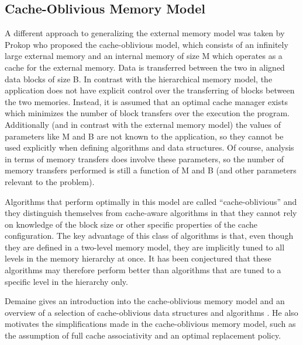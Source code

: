\documentclass{acm_proc_article-sp}
\begin{document}
\subsection{Cache-Oblivious Memory Model}
A different approach to generalizing the external memory model was taken by Prokop \cite{prokop1999coa} who proposed the cache-oblivious model, which consists of an infinitely large external memory and an internal memory of size M which operates as a cache for the external memory. Data is transferred between the two in aligned data blocks of size B. In contrast with the hierarchical memory model, the application does not have explicit control over the transferring of blocks between the two memories. Instead, it is assumed that an optimal cache manager exists which minimizes the number of block transfers over the execution the program. Additionally (and in contrast with the external memory model) the values of parameters like M and B are not known to the application, so they cannot be used explicitly when defining algorithms and data structures. Of course, analysis in terms of memory transfers does involve these parameters, so the number of memory transfers performed is still a function of M and B (and other parameters relevant to the problem).

Algorithms that perform optimally in this model are called ``cache-oblivious'' and they distinguish themselves from cache-aware algorithms in that they cannot rely on knowledge of the block size or other specific properties of the cache configuration. The key advantage of this class of algorithms is that, even though they are defined in a two-level memory model, they are implicitly tuned to all levels in the memory hierarchy at once. It has been conjectured that these algorithms may therefore perform better than algorithms that are tuned to a specific level in the hierarchy only.

Demaine gives an introduction into the cache-oblivious memory model and an overview of a selection of cache-oblivious data structures and algorithms \cite{demaine2002coa}. He also motivates the simplifications made in the cache-oblivious memory model, such as the assumption of full cache associativity and an optimal replacement policy.

\end{document}
